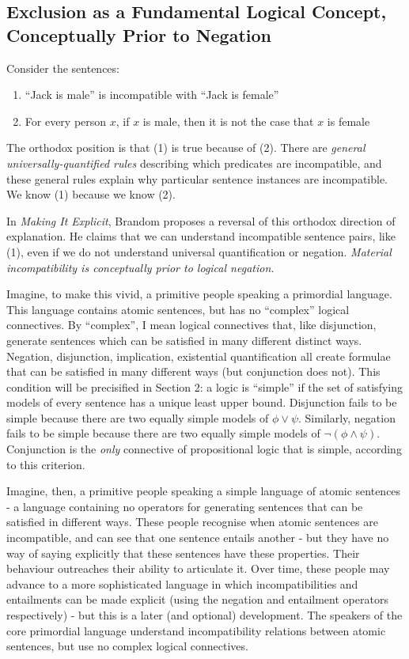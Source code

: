 \subsection{Exclusion as a Fundamental Logical Concept, Conceptually Prior to Negation}

Consider the sentences:
\begin{enumerate}

\item ``Jack is male'' is incompatible with ``Jack is female''
\item For every person $x$, if $x$ is male, then it is not the case that $x$ is female

\end{enumerate}

\NI The orthodox position is that (1) is true because of (2).  There
are \emph{general universally-quantified rules} describing which
predicates are incompatible, and these general rules explain why
particular sentence instances are incompatible.  We know (1) because
we know (2).

In \emph{Making It Explicit}\cite{brandom2}, Brandom proposes a reversal of this
orthodox direction of explanation.  He claims that we can understand
incompatible sentence pairs, like (1), even if we do not understand
universal quantification or negation.  \emph{Material incompatibility is
conceptually prior to logical negation.}

Imagine, to make this vivid, a primitive people speaking a
primordial language.  This language contains atomic sentences, but has
no ``complex'' logical connectives.  By ``complex'', I mean logical
connectives that, like disjunction, generate sentences which can be
satisfied in many different distinct ways.  Negation, disjunction,
implication, existential quantification all create formulae that can
be satisfied in many different ways (but conjunction does not). This condition will be
precisified in Section 2: a logic is ``simple'' if the set of
satisfying models of every sentence has a unique least upper
bound. Disjunction fails to be simple because there are two equally
simple models of $\phi \lor \psi$. Similarly, negation fails to be simple
because there are two equally simple models of $\neg (\phi \land
\psi)$. Conjunction is the \emph{only} connective of propositional logic that is simple,
according to this criterion.

Imagine, then, a primitive people speaking a simple language of
atomic sentences - a language containing no operators for generating
sentences that can be satisfied in different ways.  These people
recognise when atomic sentences are incompatible, and can see that one
sentence entails another - but they have no way of saying explicitly
that these sentences have these properties.  Their behaviour
outreaches their ability to articulate it.  Over time, these people
may advance to a more sophisticated language in which
incompatibilities and entailments can be made explicit (using the
negation and entailment operators respectively) - but this is a later
(and optional) development. The speakers of the core primordial
language understand incompatibility relations between atomic
sentences, but use no complex logical connectives.

